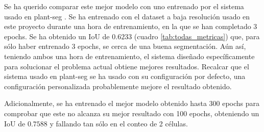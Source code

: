 Se ha querido comparar este mejor modelo con uno entrenado por el sistema usado en plant-seg \cite{Wolny2020}. Se ha entrenado con el dataset a baja resolución usado en este proyecto durante una hora de entrenamiento, en la que se han completado 3 epochs. Se ha obtenido un IoU de $0.6233$ (cuadro \ref{tab:todas_metricas}) que, para sólo haber entrenado 3 epochs, se cerca de una buena segmentación. Aún así, teniendo ambos una hora de entrenamiento, el sistema diseñado específicamente para solucionar el problema actual obtiene mejores resultados. Recalcar que el sistema usado en plant-seg se ha usado con su configuración por defecto, una configuración personalizada probablemente mejore el resultado obtenido.

Adicionalmente, se ha entrenado el mejor modelo obtenido hasta 300 epochs para comprobar que este no alcanza su mejor resultado con 100 epochs, obteniendo un IoU de $0.7588$ y fallando tan sólo en el conteo de 2 células.


